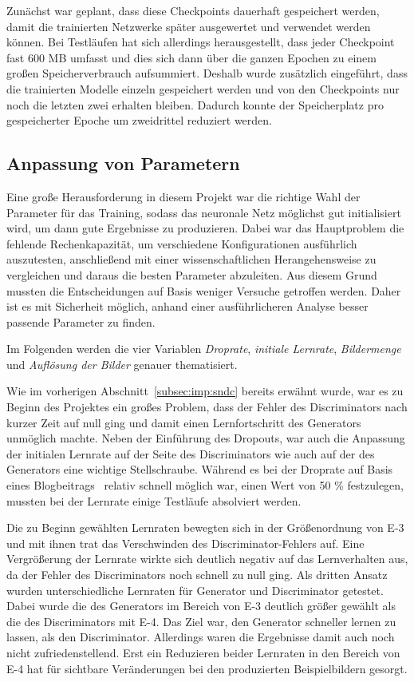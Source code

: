  Zunächst war geplant, dass diese Checkpoints dauerhaft gespeichert werden, damit die trainierten Netzwerke später ausgewertet und verwendet werden können. Bei Testläufen hat sich allerdings herausgestellt, dass jeder Checkpoint fast 600 MB umfasst und dies sich dann über die ganzen Epochen zu einem großen Speicherverbrauch aufsummiert. Deshalb wurde zusätzlich eingeführt, dass die trainierten Modelle einzeln gespeichert werden und von den Checkpoints nur noch die letzten zwei erhalten bleiben. Dadurch konnte der Speicherplatz pro gespeicherter Epoche um zweidrittel reduziert werden.
 
 \subsection{Anpassung von Parametern} %
 
 Eine große Herausforderung in diesem Projekt war die richtige Wahl der Parameter für das Training, sodass das neuronale Netz möglichst gut initialisiert wird, um dann gute Ergebnisse zu produzieren. Dabei war das Hauptproblem die fehlende Rechenkapazität, um verschiedene Konfigurationen ausführlich auszutesten, anschließend mit einer wissenschaftlichen Herangehensweise zu vergleichen und daraus die besten Parameter abzuleiten. Aus diesem Grund mussten die Entscheidungen auf Basis weniger Versuche getroffen werden. Daher ist es mit Sicherheit möglich, anhand einer ausführlicheren Analyse besser passende Parameter zu finden.
 
 Im Folgenden werden die vier Variablen \emph{Droprate}, \emph{initiale Lernrate}, \emph{Bildermenge} und \emph{Auflösung der Bilder} genauer thematisiert.
 
 Wie im vorherigen Abschnitt~\ref{subsec:imp:sndc} bereits erwähnt wurde, war es zu Beginn des Projektes ein großes Problem, dass der Fehler des Discriminators nach kurzer Zeit auf null ging und damit einen Lernfortschritt des Generators unmöglich machte. Neben der Einführung des Dropouts, war auch die Anpassung der initialen Lernrate auf der Seite des Discriminators wie auch auf der des Generators eine wichtige Stellschraube. Während es bei der Droprate auf Basis eines Blogbeitrags~\cite{brownlee2019} relativ schnell möglich war, einen Wert von 50 \% festzulegen, mussten bei der Lernrate einige Testläufe absolviert werden. 
 
 Die zu Beginn gewählten Lernraten bewegten sich in der Größenordnung von E-3 und mit ihnen trat das Verschwinden des Discriminator-Fehlers auf. Eine Vergrößerung der Lernrate wirkte sich deutlich negativ auf das Lernverhalten aus, da der Fehler des Discriminators noch schnell zu null ging. Als dritten Ansatz wurden unterschiedliche Lernraten für Generator und Discriminator getestet. Dabei wurde die des Generators im Bereich von E-3 deutlich größer gewählt als die des Discriminators mit E-4. Das Ziel war, den Generator schneller lernen zu lassen, als den Discriminator. Allerdings waren die Ergebnisse damit auch noch nicht zufriedenstellend. Erst ein Reduzieren beider Lernraten in den Bereich von E-4 hat für sichtbare Veränderungen bei den produzierten Beispielbildern gesorgt.
 
